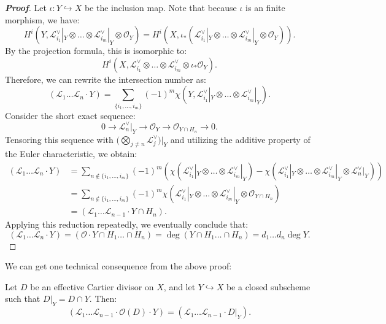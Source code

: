\begin{proof}[\textbf{Proof}]
Let $\iota: Y \hookrightarrow X$ be the inclusion map. Note that because $\iota$ is an finite morphism, we have:
\[
H^i(Y, \mathcal{L}_{i_1}^\vee|_Y \otimes \dots \otimes \mathcal{L}_{i_m}^\vee|_Y \otimes \mathcal{O}_Y) = H^i(X, \iota_*(\mathcal{L}_{i_1}^\vee|_Y \otimes \dots \otimes \mathcal{L}_{i_m}^\vee|_Y \otimes \mathcal{O}_Y)).
\]
By the projection formula, this is isomorphic to:
\[
H^i(X, \mathcal{L}_{i_1}^\vee \otimes \dots \otimes \mathcal{L}_{i_m}^\vee \otimes \iota_*\mathcal{O}_Y).
\]
Therefore, we can rewrite the intersection number as:
\[
(\mathcal{L}_1 \dots \mathcal{L}_n \cdot Y) = \sum_{\{i_1, \dots, i_m\}} (-1)^m \chi(Y, \mathcal{L}_{i_1}^\vee|_Y \otimes \dots \otimes \mathcal{L}_{i_m}^\vee|_Y).
\]
Consider the short exact sequence:
\[
0 \to \mathcal{L}_n^\vee|_Y \to \mathcal{O}_Y \to \mathcal{O}_{Y \cap H_n} \to 0.
\]
Tensoring this sequence with $\big( \bigotimes_{j \neq n} \mathcal{L}_j^\vee \big) \big|_Y$ and utilizing the additive property of the Euler characteristic, we obtain:
\begin{align*}
(\mathcal{L}_1 \dots \mathcal{L}_n \cdot Y) &= \sum_{n \notin \{i_1, \dots, i_m\}} (-1)^m \left( \chi(\mathcal{L}_{i_1}^\vee|_Y \otimes \dots \otimes \mathcal{L}_{i_m}^\vee|_Y) - \chi(\mathcal{L}_{i_1}^\vee|_Y \otimes \dots \otimes \mathcal{L}_{i_m}^\vee|_Y \otimes \mathcal{L}_n^\vee|_Y) \right) \\
&= \sum_{ n \notin \{i_1, \dots, i_m\}} (-1)^m \chi(\mathcal{L}_{i_1}^\vee|_Y \otimes \dots \otimes \mathcal{L}_{i_m}^\vee|_Y \otimes \mathcal{O}_{Y \cap H_n}) \\
&= (\mathcal{L}_1 \dots \mathcal{L}_{n-1} \cdot Y \cap H_n).
\end{align*}
Applying this reduction repeatedly, we eventually conclude that:
\[
(\mathcal{L}_1 \dots \mathcal{L}_n \cdot Y) = (\mathcal{O} \cdot Y \cap H_1 \dots \cap H_n) = \deg(Y \cap H_1 \dots \cap H_n) = d_1 \dots d_n \deg Y.
\]
\end{proof}

We can get one technical consequence from the above proof:

\begin{proposition}[20.1.D]\label{20.1.D}
Let $D$ be an effective Cartier divisor on $X$, and let $Y \hookrightarrow X$ be a closed subscheme such that $D|_Y = D \cap Y$. Then:
\[
(\mathcal{L}_1 \dots \mathcal{L}_{n-1} \cdot \mathcal{O}(D) \cdot Y) = (\mathcal{L}_1 \dots \mathcal{L}_{n-1} \cdot D|_Y).
\]
\end{proposition}

